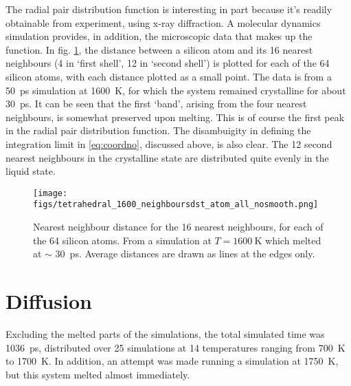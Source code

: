 \documentclass[11pt,bibliography=totoc,index=totoc]{scrbook}   %
\begin{document}
The radial pair distribution function is interesting in part because it's readily obtainable from experiment, using x-ray diffraction.
A molecular dynamics simulation provides, in addition, the microscopic data that makes up the function.
In fig. \ref{fig:nn_melting}, the distance between a silicon atom and its 16 nearest neighbours (4 in `first shell', 12 in `second shell') is plotted for each of the 64 silicon atoms, with each distance plotted as a small point.
The data is from a 50~ps simulation at 1600~K, for which the system remained crystalline for about 30~ps.
It can be seen that the first `band', arising from the four nearest neighbours, is somewhat preserved upon melting. 
This is of course the first peak in the radial pair distribution function.
The disambuigity in defining the integration limit in \eqref{eq:coordno}, discussed above, is also clear. 
The 12 second nearest neighbours in the crystalline state are distributed quite evenly in the liquid state.

\begin{figure}[htbp]
  \centering
  \texttt{[image: figs/tetrahedral\_1600\_neighboursdst\_atom\_all\_nosmooth.png]}
  \caption{Nearest neighbour distance for the 16 nearest neighbours, for each of the 64 silicon atoms.
      From a simulation at $T=\SI{1600}{\kelvin}$ which melted at $\sim$ 30~ps.
      Average distances are drawn as lines at the edges only.
  }
  \label{fig:nn_melting}
\end{figure}

%
\section{Diffusion}
%

Excluding the melted parts of the simulations, the total simulated time was 1036~ps, distributed over 25 simulations at 14 temperatures ranging from 700~K to 1700~K. In addition, an attempt was made running a simulation at 1750~K, but this system melted almost immediately.
\end{document}
